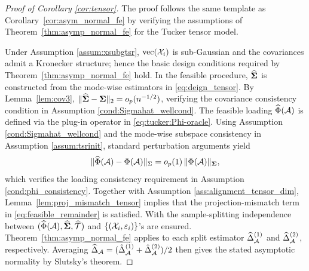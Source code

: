 \documentclass[authoryear,preprint,review,12pt]{elsarticle}
\begin{document}
\begin{proof}[Proof of Corollary \ref{cor:tensor}]
	The proof follows the same template as Corollary~\ref{cor:asym_normal_fe} by verifying
	the assumptions of Theorem~\ref{thm:asymp_normal_fe} for the Tucker tensor model.
	
	Under Assumption \ref{assum:xsubgtsr}, $\mathrm{vec}(\mathcal{X}_i)$ is sub-Gaussian and the covariances admit
	a Kronecker structure; hence the basic design conditions required by
	Theorem~\ref{thm:asymp_normal_fe} hold. 
	In the feasible procedure, $\widehat{\mathbf{ \Sigma}}$ is constructed from the mode-wise
	estimators in \eqref{eq:deign_tensor}. By Lemma~\ref{lem:cov3},
	$\|\widehat{\mathbf{ \Sigma}}-\mathbf{ \Sigma}\|_2=o_p(n^{-1/2})$, verifying the covariance consistency condition in Assumption \ref{cond:Sigmahat_wellcond}.
	The feasible loading $\widehat\Phi(\mathcal{A})$ is defined via the plug-in operator in
	\eqref{eq:tucker:Phi-oracle}. Using Assumption \ref{cond:Sigmahat_wellcond} and the mode-wise subspace consistency in Assumption \ref{assum:tsrinit}, standard perturbation arguments yield
	\[
	\|\widehat\Phi(\mathcal{A})-\Phi(\mathcal{A})\|_\Sigma=o_p(1)\,\|\Phi(\mathcal{A})\|_{\mathbf{ \Sigma}},
	\]
	which verifies the loading consistency requirement in Assumption \ref{cond:phi_consistency}.
	Together with Assumption \ref{ass:alignment_tensor_dim},  Lemma~\ref{lem:proj_mismatch_tensor}  implies that the projection-mismatch term in \eqref{eq:feasible_remainder} is satisfied. 
	With  the sample-splitting independence between $(\widehat\Phi(\mathcal{A}), \widehat{\mathbf{ \Sigma}}, \widehat{\mathcal{T}})$ and $\{(\mathcal{X}_i, \varepsilon_i)\}$'s are ensured. Theorem~\ref{thm:asymp_normal_fe} applies to each split estimator
	$\widehat\Delta_{\mathcal{A}}^{(1)}$ and $\widehat\Delta_{\mathcal{A}}^{(2)}$, respectively. 
	Averaging $\widehat\Delta_{\mathcal{A}}= (\hat\Delta_{\mathcal{A}}^{(1)}+\hat\Delta_{\mathcal{A}}^{(2)}) /2$ then
	gives the stated asymptotic normality by Slutsky's theorem.
\end{proof}
 
\end{document}
